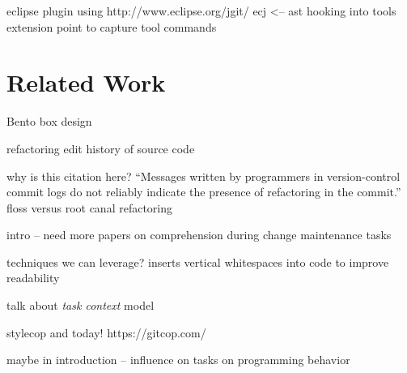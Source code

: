 \documentclass[conference]{IEEEtran}
\begin{document}
eclipse plugin using http://www.eclipse.org/jgit/
ecj <-- ast
hooking into tools extension point to capture tool commands











\section{Related Work}

Bento box design~\cite{DeLine2010a}

refactoring edit history of source code~\cite{Hayashi2012}

why is this citation here? ``Messages written by programmers in version-control commit logs do not reliably indicate the presence of refactoring in the commit.''
floss versus root canal refactoring~\cite{Murphy-Hill2012c}

intro -- need more papers on comprehension during change maintenance tasks

techniques we can leverage?
inserts vertical whitespaces into code to improve readability~\cite{Wang2011}


talk about \emph{task context} model

stylecop
and today! https://gitcop.com/


maybe in introduction -- influence on tasks on programming behavior~\cite{Ying2011a}
\end{document}

